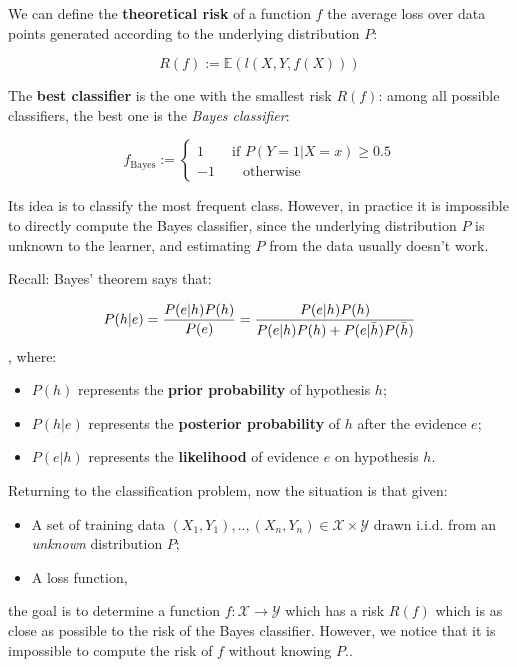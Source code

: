 We can define the \textbf{theoretical risk} of a function $f$ the average loss over data points generated according to the underlying distribution $P$:

$$
R(f) := \mathbb{E}(l(X,Y,f(X)))
$$

The \textbf{best classifier} is the one with the smallest risk $R(f)$: among all possible classifiers, the best one is the \textit{Bayes classifier}:

$$
f_{\text{Bayes}} := \begin{cases}
    1 \qquad \text{if } P(Y = 1 | X = x) \geq 0.5 \\
    -1 \qquad \text{otherwise}
\end{cases}
$$

Its idea is to classify the most frequent class. However, in practice it is impossible to directly compute the Bayes classifier, since the underlying distribution $P$ is unknown to the learner, and estimating $P$ from the data usually doesn't work.

Recall: Bayes' theorem says that:

$$
P(h|e) = \frac{P(e|h) P(h)}{P(e)} = \frac{P(e|h) P(h)}{P(e|h) P(h) + P(e|\Bar{h}) P(\Bar{h})}
$$
, where:

\begin{itemize}
    \item $P(h)$ represents the \textbf{prior probability} of hypothesis $h$;
    \item $P(h|e)$ represents the \textbf{posterior probability} of $h$ after the evidence $e$;
    \item $P(e|h)$ represents the \textbf{likelihood} of evidence $e$ on hypothesis $h$.
\end{itemize}

Returning to the classification problem, now the situation is that given:

\begin{itemize}
    \item A set of training data $(X_1, Y_1), .., (X_n, Y_n) \in \mathcal{X} \times \mathcal{Y}$ drawn i.i.d. from an \textit{unknown} distribution $P$;
    \item A loss function,
\end{itemize}

the goal is to determine a function $f: \mathcal{X} \to \mathcal{Y}$ which has a risk $R(f)$ which is as close as possible to the risk of the Bayes classifier. However, we notice that it is impossible to compute the risk of $f$ without knowing $P$..


